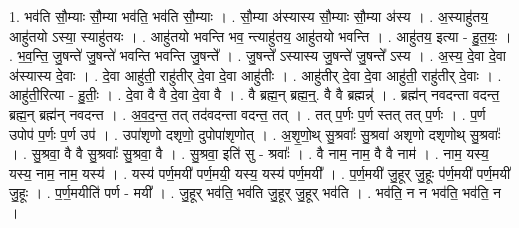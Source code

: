 \documentclass[17pt]{extarticle}
\begin{document}
1. भव॑ति सौ॒म्याः सौ॒म्या भव॑ति॒ भव॑ति सौ॒म्याः । . सौ॒म्या अ॑स्यास्य सौ॒म्याः सौ॒म्या अ॑स्य । . अ॒स्याहु॑तय॒ आहु॑तयो ऽस्या॒ स्याहु॑तयः । . आहु॑तयो भवन्ति भव॒ न्त्याहु॑तय॒ आहु॑तयो भवन्ति । . आहु॑तय॒ इत्या - हु॒त॒यः॒ । . भ॒व॒न्ति॒ जु॒षन्ते॑ जु॒षन्ते॑ भवन्ति भवन्ति जु॒षन्ते᳚ । . जु॒षन्ते᳚ ऽस्यास्य जु॒षन्ते॑ जु॒षन्ते᳚ ऽस्य । . अ॒स्य॒ दे॒वा दे॒वा अ॑स्यास्य दे॒वाः । . दे॒वा आहु॑ती॒ राहु॑तीर् दे॒वा दे॒वा आहु॑तीः । . आहु॑तीर् दे॒वा दे॒वा आहु॑ती॒ राहु॑तीर् दे॒वाः । . आहु॑ती॒रित्या - हु॒तीः॒ । . दे॒वा वै वै दे॒वा दे॒वा वै । . वै ब्रह्म॒न् ब्रह्म॒न्॒. वै वै ब्रह्मन्न्॑ । . ब्रह्म॑न् नवदन्ता वदन्त॒ ब्रह्म॒न् ब्रह्म॑न् नवदन्त । . अ॒व॒द॒न्त॒ तत् तद॑वदन्ता वदन्त॒ तत् । . तत् प॒र्णः प॒र्ण स्तत् तत् प॒र्णः । . प॒र्ण उपोप॑ प॒र्णः प॒र्ण उप॑ । . उपा॑शृणो दशृणो॒ दुपोपा॑शृणोत् । . अ॒शृ॒णो॒थ् सु॒श्रवाः᳚ सु॒श्रवा॑ अशृणो दशृणोथ् सु॒श्रवाः᳚ । . सु॒श्रवा॒ वै वै सु॒श्रवाः᳚ सु॒श्रवा॒ वै । . सु॒श्रवा॒ इति॑ सु - श्रवाः᳚ । . वै नाम॒ नाम॒ वै वै नाम॑ । . नाम॒ यस्य॒ यस्य॒ नाम॒ नाम॒ यस्य॑ । . यस्य॑ पर्ण॒मयी॑ पर्ण॒मयी॒ यस्य॒ यस्य॑ पर्ण॒मयी᳚ । . प॒र्ण॒मयी॑ जु॒हूर् जु॒हूः प॑र्ण॒मयी॑ पर्ण॒मयी॑ जु॒हूः । . प॒र्ण॒मयीति॑ पर्ण - मयी᳚ । . जु॒हूर् भव॑ति॒ भव॑ति जु॒हूर् जु॒हूर् भव॑ति । . भव॑ति॒ न न भव॑ति॒ भव॑ति॒ न । \newline
\end{document}
